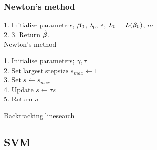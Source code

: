 \begin{appendices}
\subsubsection{Newton's method}

\begin{algorithm}[H]
    1. Initialise parameters; $\bm{\beta}_0$, $\lambda_0$, $\epsilon$, $L_0 = L(\bm{\beta}_0)$, $m$\\
    2.  
    3. Return $\hat{\bm{\beta}}$.\\
    \caption{Newton's method}
\end{algorithm}
\label{algo:newton}

\begin{algorithm}[H]
    1. Initialise parameters; $\gamma, \tau$ \\
    2. Set largest stepsize $s_{max}\leftarrow 1$ \\
    3. Set $s \leftarrow s_{max}$ \\
    4.  {
        Update $s\leftarrow \tau s$ \\
    }
    5. Return $s$
    \caption{Backtracking linesearch}
\end{algorithm}
\label{algo:line}

\subsection{SVM}

\end{appendices}
